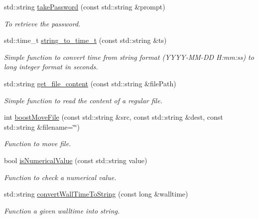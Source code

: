 \begin{DoxyCompactItemize}
std::string \hyperlink{namespacevishnu_a699510f2ba6cb03bd9a6f3696abd9860}{takePassword} (const std::string \&prompt)
\begin{DoxyCompactList}\small\item\em To retrieve the password. \item\end{DoxyCompactList}\item 
std::time\_\-t \hyperlink{namespacevishnu_ace1a774c9d738133e7cdfe505d358764}{string\_\-to\_\-time\_\-t} (const std::string \&ts)
\begin{DoxyCompactList}\small\item\em Simple function to convert time from string format (YYYY-\/MM-\/DD H:mm:ss) to long integer format in seconds. \item\end{DoxyCompactList}\item 
std::string \hyperlink{namespacevishnu_a50b77ca8a04c384cba2b8b6cdec4a26f}{get\_\-file\_\-content} (const std::string \&filePath)
\begin{DoxyCompactList}\small\item\em Simple function to read the content of a regular file. \item\end{DoxyCompactList}\item 
int \hyperlink{namespacevishnu_a0e3a3913b049d96a08712f45d71e86cb}{boostMoveFile} (const std::string \&src, const std::string \&dest, const std::string \&filename=\char`\"{}\char`\"{})
\begin{DoxyCompactList}\small\item\em Function to move file. \item\end{DoxyCompactList}\item 
bool \hyperlink{namespacevishnu_a8087df6ef072800cecc1bf4e85d9aca5}{isNumericalValue} (const std::string value)
\begin{DoxyCompactList}\small\item\em Function to check a numerical value. \item\end{DoxyCompactList}\item 
std::string \hyperlink{namespacevishnu_ad5bea19658f717e721e13dacad591b2a}{convertWallTimeToString} (const long \&walltime)
\begin{DoxyCompactList}\small\item\em Function a given walltime into string. \item\end{DoxyCompactList}\item 

\end{DoxyCompactItemize}
